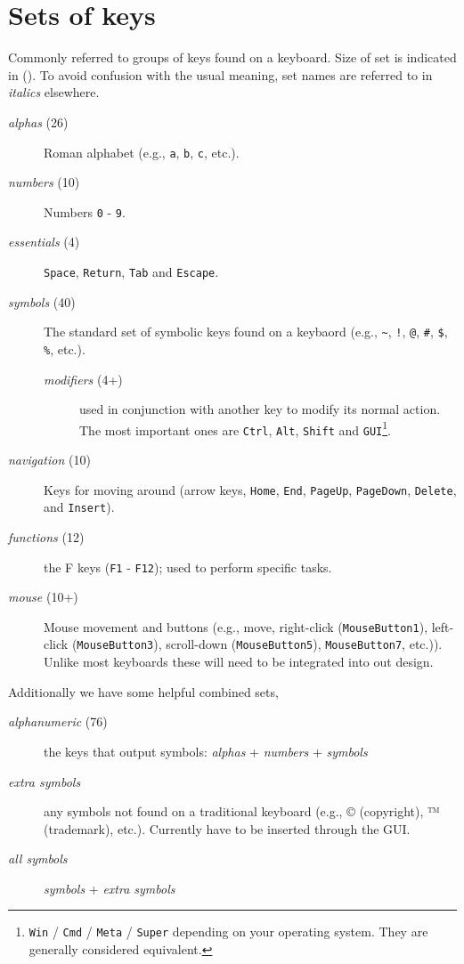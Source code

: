 \documentclass[logo,bsc,singlespacing,parskip]{infthesis}
\begin{document}
\section{Sets of keys}
\label{sec:org6f4a026}
Commonly referred to groups of keys found on a keyboard.
Size of set is indicated in ().
To avoid confusion with the usual meaning, set names are referred to in \emph{italics} elsewhere.

\begin{mdframed}
\begin{description}
\item[{\emph{alphas} (26)}] Roman alphabet (e.g., \texttt{a}, \texttt{b}, \texttt{c}, etc.).
\item[{\emph{numbers} (10)}] Numbers \texttt{0} - \texttt{9}.
\item[{\emph{essentials} (4)}] \texttt{Space}, \texttt{Return}, \texttt{Tab} and \texttt{Escape}.
\item[{\emph{symbols} (40)}] The standard set of symbolic keys found on a keybaord (e.g.,  \texttt{\textasciitilde{}}, \texttt{!}, \texttt{@}, \texttt{\#}, \texttt{\$}, \texttt{\%}, etc.).
\begin{description}
\item[{\emph{modifiers} (4+)}] used in conjunction with another key to modify its normal action. The most important ones are \texttt{Ctrl}, \texttt{Alt}, \texttt{Shift} and \texttt{GUI}\footnote{\texttt{Win} / \texttt{Cmd} / \texttt{Meta} / \texttt{Super} depending on your operating system. They are generally considered equivalent.}.
\end{description}
\item[{\emph{navigation} (10)}] Keys for moving around (arrow keys, \texttt{Home}, \texttt{End}, \texttt{PageUp}, \texttt{PageDown}, \texttt{Delete}, and \texttt{Insert}).
\item[{\emph{functions} (12)}] the F keys (\texttt{F1} - \texttt{F12}); used to perform specific tasks.
\item[{\emph{mouse} (10+)}] Mouse movement and buttons (e.g., move, right-click (\texttt{MouseButton1}), left-click (\texttt{MouseButton3}), scroll-down (\texttt{MouseButton5}), \texttt{MouseButton7}, etc.)).
Unlike most keyboards these will need to be integrated into out design.
\end{description}
Additionally we have some helpful combined sets,
\begin{description}
\item[{\emph{alphanumeric} (76)}] the keys that output symbols: \emph{alphas} + \emph{numbers} + \emph{symbols}
\item[{\emph{extra symbols} }] any symbols not found on a traditional keyboard (e.g., © (copyright), ™ (trademark), etc.).
Currently have to be inserted through the GUI.
\item[{\emph{all symbols}}] \emph{symbols} + \emph{extra symbols}
\end{description}
\end{mdframed}
\end{document}
